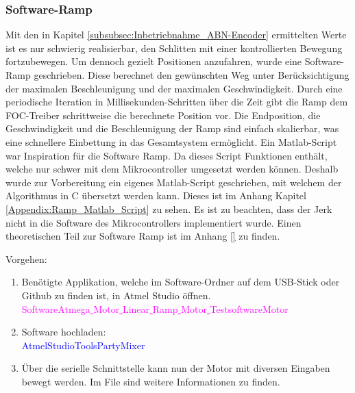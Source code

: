 \subsubsection{Software-Ramp}
\label{subsubsec:Software_Ramp}

Mit den in Kapitel \ref{subsubsec:Inbetriebnahme_ABN-Encoder} ermittelten Werte ist es nur schwierig realisierbar, den Schlitten mit einer kontrollierten Bewegung fortzubewegen. Um dennoch gezielt Positionen anzufahren, wurde eine Software-Ramp geschrieben. Diese berechnet den gewünschten Weg unter Berücksichtigung der maximalen Beschleunigung und der maximalen Geschwindigkeit. Durch eine periodische Iteration in Millisekunden-Schritten über die Zeit gibt die Ramp dem FOC-Treiber schrittweise die berechnete Position vor. Die Endposition, die Geschwindigkeit und die Beschleunigung der Ramp sind einfach skalierbar, was eine schnellere Einbettung in das Gesamtsystem ermöglicht. Ein Matlab-Script war Inspiration für die Software Ramp. Da dieses Script Funktionen enthält, welche nur schwer mit dem Mikrocontroller umgesetzt werden können. Deshalb wurde zur Vorbereitung ein eigenes Matlab-Script geschrieben, mit welchem der Algorithmus in C übersetzt werden kann. Dieses ist im Anhang Kapitel \ref{Appendix:Ramp_Matlab_Script} zu sehen. Es ist zu beachten, dass der Jerk nicht in die Software des Mikrocontrollers implementiert wurde. Einen theoretischen Teil zur Software Ramp ist im Anhang \ref{} zu finden. \cite{bearee_gentrajm_2007}

Vorgehen:
\begin{enumerate}
\item Benötigte Applikation, welche im Software-Ordner auf dem USB-Stick oder Github \cite{aebi_projekt-6softwareatmega_2020} zu finden ist, in Atmel Studio öffnen.\\
\textcolor{magenta}{Software\textrightarrow Atmega\underline{ }Motor\underline{ }Linear\underline{ }Ramp\underline{ }Motor\underline{ }Testsoftware\textrightarrow Motor}\\

\item Software hochladen:\\
\textcolor{blue}{AtmelStudio\textrightarrow Tools\textrightarrow PartyMixer}\\

\item Über die serielle Schnittstelle kann nun der Motor mit diversen Eingaben bewegt werden. Im File sind weitere Informationen zu finden.

\end{enumerate}